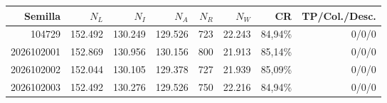 \begin{tabular}{@{}rrrrrrrr@{}}\hline
Semilla & $N_L$ & $N_I$ & $N_A$ & $N_R$ & $N_W$ & CR & TP/Col./Desc. \\ \hline
104729 & 152.492 & 130.249 & 129.526 & 723 & 22.243 & 84,94\% & 0/0/0 \\ 
2026102001 & 152.869 & 130.956 & 130.156 & 800 & 21.913 & 85,14\% & 0/0/0 \\ 
2026102002 & 152.044 & 130.105 & 129.378 & 727 & 21.939 & 85,09\% & 0/0/0 \\ 
2026102003 & 152.492 & 130.276 & 129.526 & 750 & 22.216 & 84,94\% & 0/0/0 \\ 
\hline\end{tabular}
